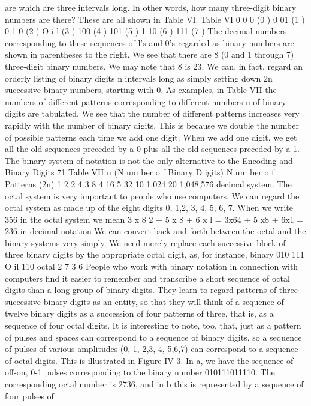 are which are three intervals long. In other words, how many
three-digit binary numbers are there? These are all shown in
Table VI.
Table VI
0 0 0 (0 )
0 01 (1 )
0 1 0 (2 )
O i l (3 )
100 (4 )
101 (5 )
1 10 (6 )
111 (7 )
The decimal numbers corresponding to these sequences of l’s
and 0’s regarded as binary numbers are shown in parentheses to
the right.
We see that there are 8 (0 and 1 through 7) three-digit binary
numbers. We may note that 8 is 23. We can, in fact, regard an
orderly listing of binary digits n intervals long as simply setting
down 2n successive binary numbers, starting with 0. As examples,
in Table VII the numbers of different patterns corresponding to
different numbers n of binary digits are tabulated.
We see that the number of different patterns increases very
rapidly with the number of binary digits. This is because we double
the number of possible patterns each time we add one digit. When
we add one digit, we get all the old sequences preceded by a 0 plus
all the old sequences preceded by a 1.
The binary system of notation is not the only alternative to the
Encoding and Binary Digits
71
Table VII
n (N um ber o f Binary D igits) N um ber o f Patterns (2n)
1 2
2 4
3 8
4 16
5 32
10 1,024
20 1,048,576
decimal system. The octal system is very important to people who
use computers. We can regard the octal system as made up of the
eight digits 0, 1,2, 3, 4, 5, 6, 7.
When we write 356 in the octal system we mean
3 x 8 2 + 5 x 8 + 6 x l
= 3x64 + 5 x8 + 6x1
= 236 in decimal notation
We can convert back and forth between the octal and the binary
systems very simply. We need merely replace each successive block
of three binary digits by the appropriate octal digit, as, for instance,
binary 010 111 O il 110
octal 2 7 3 6
People who work with binary notation in connection with computers
find it easier to remember and transcribe a short sequence
of octal digits than a long group of binary digits. They learn to
regard patterns of three successive binary digits as an entity, so that
they will think of a sequence of twelve binary digits as a succession
of four patterns of three, that is, as a sequence of four octal digits.
It is interesting to note, too, that, just as a pattern of pulses and
spaces can correspond to a sequence of binary digits, so a sequence
of pulses of various amplitudes (0, 1, 2,3, 4, 5,6,7) can correspond
to a sequence of octal digits. This is illustrated in Figure IV-3. In
a, we have the sequence of off-on, 0-1 pulses corresponding to the
binary number 010111011110. The corresponding octal number is
2736, and in b this is represented by a sequence of four pulses of
